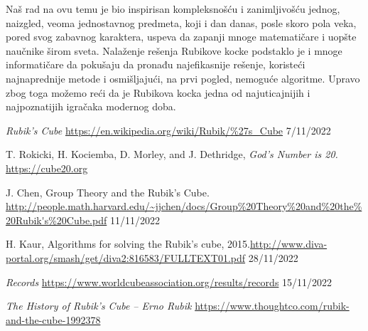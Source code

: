 \documentclass[a4paper]{article}
\begin{document}
Naš rad na ovu temu je bio inspirisan kompleksnošću i zanimljivošću jednog, naizgled, veoma jednostavnog predmeta, koji i dan danas, posle skoro pola veka,
pored svog zabavnog karaktera, uspeva da zapanji mnoge matematičare i uopšte naučnike širom sveta. Nalaženje rešenja Rubikove kocke podstaklo je i mnoge
informatičare da pokušaju da pronađu najefikasnije rešenje, koristeći najnaprednije metode i osmišljajući, na prvi pogled, nemoguće algoritme.
Upravo zbog toga možemo reći da je Rubikova kocka jedna od najuticajnijih i najpoznatijih igračaka modernog doba.
 \pagebreak

\appendix

\begin{thebibliography}{9}

 \emph{Rubik's Cube} \url{https://en.wikipedia.org/wiki/Rubik/\%27s\_Cube} 7/11/2022

 T. Rokicki, H. Kociemba, D. Morley, and J. Dethridge, \emph{God’s Number is 20.} \url{https://cube20.org}

 J. Chen, Group Theory and the Rubik’s Cube. \url{http://people.math.harvard.edu/~jjchen/docs/Group\%20Theory\%20and\%20the\%20Rubik's\%20Cube.pdf} 11/11/2022

 H. Kaur, Algorithms for solving the Rubik’s cube, 2015.\url{http://www.diva-portal.org/smash/get/diva2:816583/FULLTEXT01.pdf} 28/11/2022


 \emph{Records} \url{https://www.worldcubeassociation.org/results/records} 15/11/2022

\bibitem{} \emph{The History of Rubik's Cube – Erno Rubik} \url{https://www.thoughtco.com/rubik-and-the-cube-1992378}

\end{thebibliography}

\appendix
\end{document}
